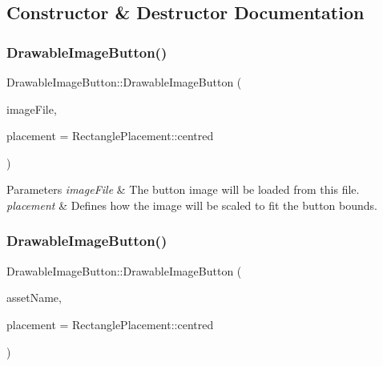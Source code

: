 \subsection{Constructor \& Destructor Documentation}
\mbox{\label{classDrawableImageButton_ad27eacc631a480df3acfe72319bd47e2}} 
\subsubsection{\texorpdfstring{Drawable\+Image\+Button()}{DrawableImageButton()}\hspace{0.1cm}{\footnotesize\ttfamily [1/3]}}
{\footnotesize\ttfamily Drawable\+Image\+Button\+::\+Drawable\+Image\+Button (\begin{DoxyParamCaption}\item[{File}]{image\+File,  }\item[{Rectangle\+Placement}]{placement = {\ttfamily RectanglePlacement\+:\+:centred} }\end{DoxyParamCaption})}


\begin{DoxyParams}{Parameters}
{\em image\+File} & The button image will be loaded from this file.\\
\hline
{\em placement} & Defines how the image will be scaled to fit the button bounds. \\
\hline
\end{DoxyParams}
\mbox{\label{classDrawableImageButton_ae075bdfc11c4054c0bb1d83910f0eb78}} 
\subsubsection{\texorpdfstring{Drawable\+Image\+Button()}{DrawableImageButton()}\hspace{0.1cm}{\footnotesize\ttfamily [2/3]}}
{\footnotesize\ttfamily Drawable\+Image\+Button\+::\+Drawable\+Image\+Button (\begin{DoxyParamCaption}\item[{String}]{asset\+Name,  }\item[{Rectangle\+Placement}]{placement = {\ttfamily RectanglePlacement\+:\+:centred} }\end{DoxyParamCaption})}


